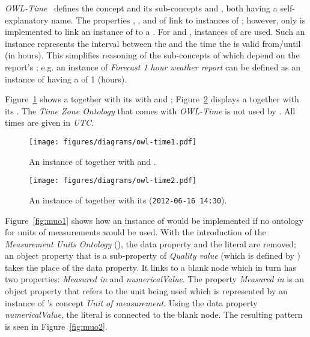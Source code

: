 \vspace{1em}

\emph{OWL-Time}~\cite{owl-time} defines the concept  and its sub-concepts  and , both having a self-explanatory name. The properties , , and  of  link to instances of ; however, only  is implemented to link an instance of  to a . For  and , instances of  are used. Such an instance represents the interval between the  and the time the  is valid from/until (in hours). This simplifies reasoning of the sub-concepts of  which depend on the report's ; e.g. an instance of \emph{Forecast 1 hour weather report} can be defined as an instance of  having a  of \num{1} (hours).

Figure~\ref{fig:owl_time1} shows a  together with its with  and ; Figure~\ref{fig:owl_time2} displays a  together with its . The \emph{Time Zone Ontology} that comes with \emph{OWL-Time} is not used by \smarthomeweather. All times are given in \emph{UTC}.

\begin{figure}
  \centering
  \texttt{[image: figures/diagrams/owl-time1.pdf]}
  \caption[An instance of ]{An instance of  together with  and .}
  \label{fig:owl_time1}
\end{figure}

\begin{figure}
  \centering
  \texttt{[image: figures/diagrams/owl-time2.pdf]}
  \caption[A instance of ]{An instance of  together with its  (\texttt{2012-06-16~14:30}).}
  \label{fig:owl_time2}
\end{figure}

\vspace{1em}

Figure~\ref{fig:muo1} shows how an instance of  would be implemented if no ontology for units of measurements would be used. With the introduction of the \emph{Measurement Units Ontology} (\muo), the data property and the literal are removed; an object property that is a sub-property of \emph{Quality value} (which is defined by \muo) takes the place of the data property. It links to a blank node which in turn has two properties: \emph{Measured in} and \emph{numericalValue}. The property \emph{Measured in} is an object property that refers to the unit being used which is represented by an instance of \muo's concept \emph{Unit of measurement}. Using the data property \emph{numericalValue}, the literal is connected to the blank node. The resulting pattern is seen in Figure~\ref{fig:muo2}.

